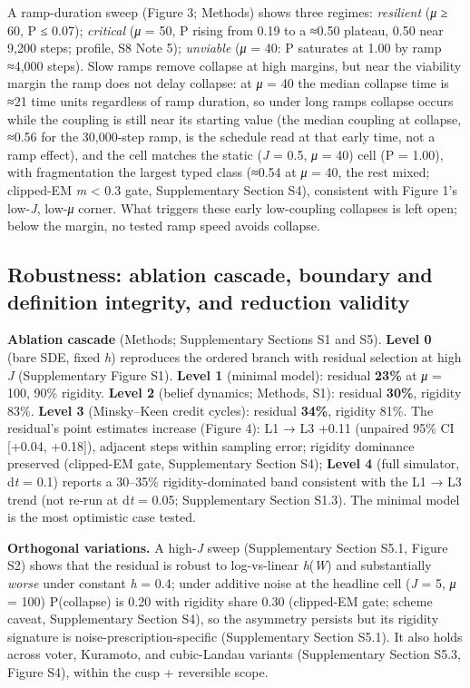 \documentclass[11pt,letterpaper]{article}
\begin{document}
A ramp-duration sweep (Figure 3; Methods) shows three regimes: \emph{resilient} (\emph{μ} ≥ 60, P ≤ 0.07); \emph{critical} (\emph{μ} = 50, P rising from 0.19 to a ≈0.50 plateau, 0.50 near 9,200 steps; profile, S8 Note 5); \emph{unviable} (\emph{μ} = 40: P saturates at 1.00 by ramp ≈4,000 steps). Slow ramps remove collapse at high margins, but near the viability margin the ramp does not delay collapse: at \emph{μ} = 40 the median collapse time is ≈21 time units regardless of ramp duration, so under long ramps collapse occurs while the coupling is still near its starting value (the median coupling at collapse, ≈0.56 for the 30,000-step ramp, is the schedule read at that early time, not a ramp effect), and the cell matches the static (\emph{J} = 0.5, \emph{μ} = 40) cell (P = 1.00), with fragmentation the largest typed class (≈0.54 at \emph{μ} = 40, the rest mixed; clipped-EM \textbar{}\emph{m}\textbar{} \textless{} 0.3 gate, Supplementary Section S4), consistent with Figure 1's low-\emph{J}, low-\emph{μ} corner. What triggers these early low-coupling collapses is left open; below the margin, no tested ramp speed avoids collapse.

\subsection{Robustness: ablation cascade, boundary and definition integrity, and reduction validity}\label{robustness-ablation-cascade-boundary-and-definition-integrity-and-reduction-validity}

\textbf{Ablation cascade} (Methods; Supplementary Sections S1 and S5). \textbf{Level 0} (bare SDE, fixed \emph{h}) reproduces the ordered branch with residual selection at high \emph{J} (Supplementary Figure S1). \textbf{Level 1} (minimal model): residual \textbf{23\%} at \emph{μ} = 100, 90\% rigidity. \textbf{Level 2} (belief dynamics; Methods, S1): residual \textbf{30\%}, rigidity 83\%. \textbf{Level 3} (Minsky--Keen credit cycles): residual \textbf{34\%}, rigidity 81\%. The residual's point estimates increase (Figure 4): L1 → L3 +0.11 (unpaired 95\% CI {[}+0.04, +0.18{]}), adjacent steps within sampling error; rigidity dominance preserved (clipped-EM gate, Supplementary Section S4); \textbf{Level 4} (full simulator, d\emph{t} = 0.1) reports a 30--35\% rigidity-dominated band consistent with the L1 → L3 trend (not re-run at d\emph{t} = 0.05; Supplementary Section S1.3). The minimal model is the most optimistic case tested.

\textbf{Orthogonal variations.} A high-\emph{J} sweep (Supplementary Section S5.1, Figure S2) shows that the residual is robust to log-vs-linear \emph{h}(\emph{W}) and substantially \emph{worse} under constant \emph{h} = 0.4; under additive noise at the headline cell (\emph{J} = 5, \emph{μ} = 100) P(collapse) is 0.20 with rigidity share 0.30 (clipped-EM gate; scheme caveat, Supplementary Section S4), so the asymmetry persists but its rigidity signature is noise-prescription-specific (Supplementary Section S5.1). It also holds across voter, Kuramoto, and cubic-Landau variants (Supplementary Section S5.3, Figure S4), within the cusp + reversible scope.
\end{document}
